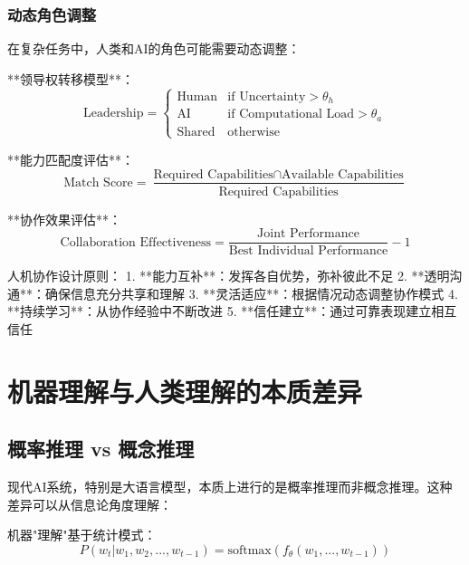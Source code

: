 \subsubsection{动态角色调整} %

在复杂任务中，人类和AI的角色可能需要动态调整：

**领导权转移模型**：
\begin{equation}
\text{Leadership} = \begin{cases}
\text{Human} & \text{if } \text{Uncertainty} > \theta_h \\
\text{AI} & \text{if } \text{Computational Load} > \theta_a \\
\text{Shared} & \text{otherwise}
\end{cases}
\end{equation}

**能力匹配度评估**：
\begin{equation}
\text{Match Score} = \frac{\text{Required Capabilities} \cap \text{Available Capabilities}}{\text{Required Capabilities}}
\end{equation}

**协作效果评估**：
\begin{equation}
\text{Collaboration Effectiveness} = \frac{\text{Joint Performance}}{\text{Best Individual Performance}} - 1
\end{equation}

\begin{center}
人机协作设计原则：
1. **能力互补**：发挥各自优势，弥补彼此不足
2. **透明沟通**：确保信息充分共享和理解
3. **灵活适应**：根据情况动态调整协作模式
4. **持续学习**：从协作经验中不断改进
5. **信任建立**：通过可靠表现建立相互信任
\end{center}

\section{机器理解与人类理解的本质差异}

\subsection{概率推理 vs 概念推理}

现代AI系统，特别是大语言模型，本质上进行的是概率推理而非概念推理。这种差异可以从信息论角度理解：

机器"理解"基于统计模式：
\begin{equation}
P(w_t|w_1, w_2, ..., w_{t-1}) = \text{softmax}(f_\theta(w_1, ..., w_{t-1}))
\end{equation}

